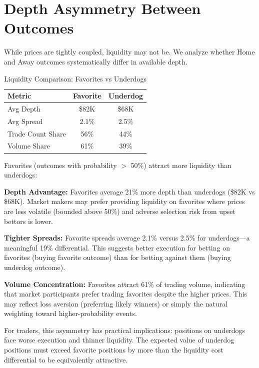 \section{Depth Asymmetry Between Outcomes}

While prices are tightly coupled, liquidity may not be. We analyze whether Home and Away outcomes systematically differ in available depth.

\begin{table}[H]
\centering
\caption{Liquidity Comparison: Favorites vs Underdogs}
\label{tab:fav-underdog}
\begin{tabular}{lcc}
\toprule
\textbf{Metric} & \textbf{Favorite} & \textbf{Underdog} \\
\midrule
Avg Depth & \$82K & \$68K \\
Avg Spread & 2.1\% & 2.5\% \\
Trade Count Share & 56\% & 44\% \\
Volume Share & 61\% & 39\% \\
\bottomrule
\end{tabular}
\end{table}

Favorites (outcomes with probability $>$ 50\%) attract more liquidity than underdogs:

\textbf{Depth Advantage:} Favorites average 21\% more depth than underdogs (\$82K vs \$68K). Market makers may prefer providing liquidity on favorites where prices are less volatile (bounded above 50\%) and adverse selection risk from upset bettors is lower.

\textbf{Tighter Spreads:} Favorite spreads average 2.1\% versus 2.5\% for underdogs---a meaningful 19\% differential. This suggests better execution for betting on favorites (buying favorite outcome) than for betting against them (buying underdog outcome).

\textbf{Volume Concentration:} Favorites attract 61\% of trading volume, indicating that market participants prefer trading favorites despite the higher prices. This may reflect loss aversion (preferring likely winners) or simply the natural weighting toward higher-probability events.

For traders, this asymmetry has practical implications: positions on underdogs face worse execution and thinner liquidity. The expected value of underdog positions must exceed favorite positions by more than the liquidity cost differential to be equivalently attractive.

